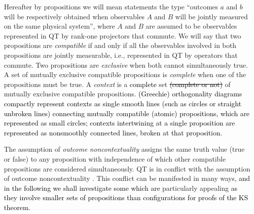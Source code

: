 \documentclass[%
  twocolumn,
 showpacs,
 showkeys,
 preprintnumbers,
 amsmath,amssymb,
 aps,
  pra,
  longbibliography,
 floatfix,
 ]{revtex4-1}
\newcommand{\karl}[1]{\textcolor{black}{#1}}
\begin{document}
Hereafter by propositions we will mean statements the type ``outcomes $a$ and $b$ will be respectively obtained
when observables $A$ and $B$ will be jointly measured on the same physical system'',
where $A$ and $B$ are assumed to be observables represented in QT by rank-one projectors that commute.
We will say that two propositions are {\em compatible} if and only if all the observables involved in both propositions
are jointly measurable, i.e., represented in QT by operators that commute.
Two propositions are {\em exclusive} when both cannot simultaneously true.
 A set of mutually exclusive compatible propositions is {\em complete} when one of the propositions must be true.
A {\em context} is a \karl{complete} set \karl{\sout{(complete or not)}} of mutually exclusive compatible propositions.
\karl{(Greechie) orthogonality diagrams~\cite{greechie:71} compactly represent contexts as single smooth lines
(such as circles or straight unbroken lines) connecting mutually compatible (atomic) propositions,
which are represented as small circles;
contexts intertwining at a single proposition are represented as nonsmoothly connected lines, broken at that proposition.}

The assumption of {\em outcome noncontextuality} assigns the same truth value (true or false) to any proposition
with independence of which other compatible propositions are considered simultaneously.
QT is in conflict with the assumption of outcome noncontextuality \cite{code1, code2, code3, code4}.
This conflict can be manifested in many ways,
\karl{and in the following we shall investigate some which are} particularly appealing \karl{as they involve
smaller sets of propositions than configurations for proofs of the KS theorem.}
\end{document}
